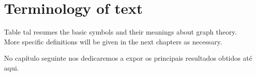 
\section{Terminology of text}

Table tal resumes the basic symbols and their meanings about graph theory.
More specific definitions will be given in the next chapters as necessary.



 No capítulo seguinte nos dedicaremos a expor os principais resultados obtidos até aqui.

